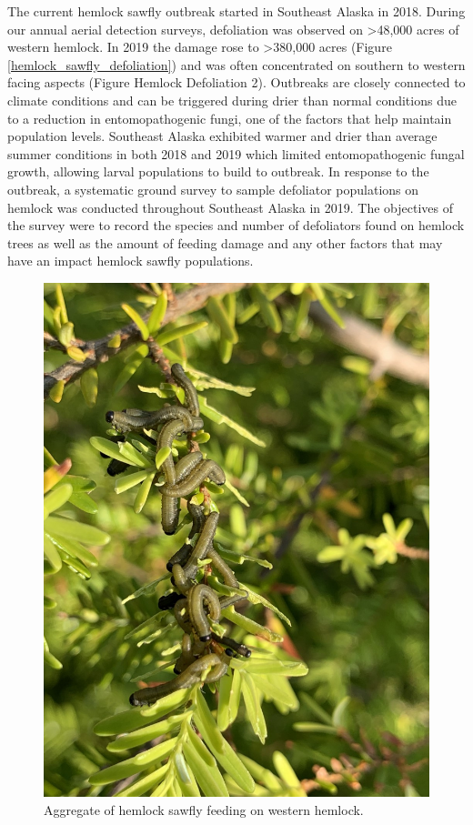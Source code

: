 The current hemlock sawfly outbreak started in Southeast Alaska in 2018.  During our annual aerial detection surveys, defoliation was observed on >48,000 acres of western hemlock.  In 2019 the damage rose to >380,000 acres (Figure \ref{hemlock_sawfly_defoliation}) and was often concentrated on southern to western facing aspects (Figure Hemlock Defoliation 2). Outbreaks are closely connected to climate conditions and can be triggered during drier than normal conditions due to a reduction in entomopathogenic fungi, one of the factors that help maintain population levels.   Southeast Alaska exhibited warmer and drier than average summer conditions in both 2018 and 2019 which limited entomopathogenic fungal growth, allowing larval populations to build to outbreak. In response to the outbreak, a systematic ground survey to sample defoliator populations on hemlock was conducted throughout Southeast Alaska in 2019.  The objectives of the survey were to record the species and number of defoliators found on hemlock trees as well as the amount of feeding damage and any other factors that may have an impact hemlock sawfly populations.

\begin{figure}[H]
\begin{center}
\vspace{2mm}
\includegraphics[width=\textwidth]{img/hemlock_sawfly_larvae.jpg}
\caption{Aggregate of hemlock sawfly feeding on western hemlock.}
\label{hemlock_sawfly_larvae}
\end{center}
\end{figure}



